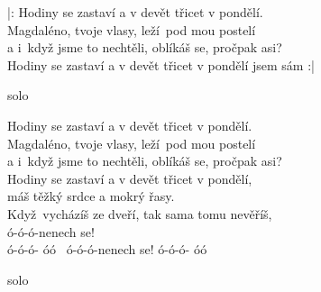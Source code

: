 \begin{song}{}
\nochordbreak 

\begin{refren}
   |: Hodiny se zastaví a v devět třicet v pondělí. \\
   Magdaléno, tvoje vlasy, leží~pod mou postelí \\
   a i~když jsme to nechtěli, oblíkáš se, pročpak asi? \\
   Hodiny se zastaví a v devět třicet v pondělí jsem sám :|
\end{refren}
  \begin{optional}{solo}
      \solospace {}   \solospace {}  
  \end{optional}
\begin{refren}
   Hodiny se zastaví a v devět třicet v pondělí. \\
   Magdaléno, tvoje vlasy, leží~pod mou postelí \\
   a i~když jsme to nechtěli, oblíkáš se, pročpak asi? \\
   Hodiny se zastaví a v devět třicet v pondělí, \\
   máš těžký srdce a mokrý řasy. \\
   Když~vycházíš ze dveří, tak sama tomu nevěříš, \\
   ó-ó-ó-nenech se! \\
   ó-ó-ó- óó~    ó-ó-ó-nenech se!     ó-ó-ó- óó~    
\end{refren}
  \begin{optional}{solo}
   \solospace {}   \solospace {} 
  \end{optional}
\end{song}
\pagebreak
